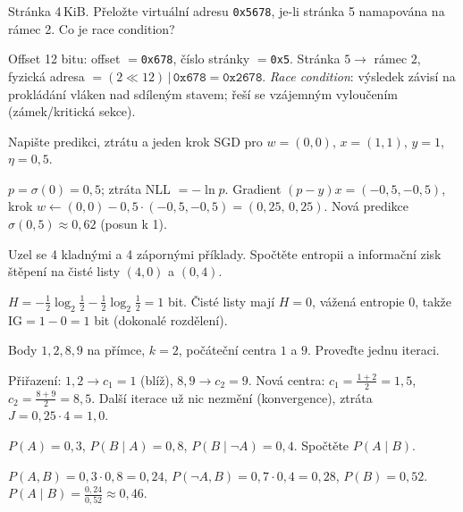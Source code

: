 \begin{zadani}Stránka 4\,KiB. Přeložte virtuální adresu \texttt{0x5678}, je-li stránka 5 namapována na rámec 2. Co je race condition?\end{zadani}
\begin{reseni}Offset 12 bitu: offset $=$\texttt{0x678}, číslo stránky $=$\texttt{0x5}. Stránka $5\to$ rámec $2$, fyzická adresa $=(2\ll12)\,|\,\texttt{0x678}=\texttt{0x2678}$. \emph{Race condition}: výsledek závisí na prokládání vláken nad sdíleným stavem; řeší se vzájemným vyloučením (zámek/kritická sekce).\end{reseni}

\begin{zadani}Napište predikci, ztrátu a jeden krok SGD pro $w=(0,0)$, $x=(1,1)$, $y=1$, $\eta=0{,}5$.\end{zadani}
\begin{reseni}$p=\sigma(0)=0{,}5$; ztráta NLL $=-\ln p$. Gradient $(p-y)x=(-0{,}5,-0{,}5)$, krok $w\leftarrow(0,0)-0{,}5\cdot(-0{,}5,-0{,}5)=(0{,}25,\,0{,}25)$. Nová predikce $\sigma(0{,}5)\approx0{,}62$ (posun k 1).\end{reseni}

\begin{zadani}Uzel se 4 kladnými a 4 zápornými příklady. Spočtěte entropii a informační zisk štěpení na čisté listy $(4,0)$ a $(0,4)$.\end{zadani}
\begin{reseni}$H=-\tfrac12\log_2\tfrac12-\tfrac12\log_2\tfrac12=1$ bit. Čisté listy mají $H=0$, vážená entropie $0$, takže $\mathrm{IG}=1-0=1$ bit (dokonalé rozdělení).\end{reseni}

\begin{zadani}Body $1,2,8,9$ na přímce, $k=2$, počáteční centra $1$ a $9$. Proveďte jednu iteraci.\end{zadani}
\begin{reseni}Přiřazení: $1,2\to c_1{=}1$ (blíž), $8,9\to c_2{=}9$. Nová centra: $c_1=\tfrac{1+2}{2}=1{,}5$, $c_2=\tfrac{8+9}{2}=8{,}5$. Další iterace už nic nezmění (konvergence), ztráta $J=0{,}25\cdot4=1{,}0$.\end{reseni}

\begin{zadani}$P(A)=0{,}3$, $P(B\mid A)=0{,}8$, $P(B\mid\neg A)=0{,}4$. Spočtěte $P(A\mid B)$.\end{zadani}
\begin{reseni}$P(A,B)=0{,}3\cdot0{,}8=0{,}24$, $P(\neg A,B)=0{,}7\cdot0{,}4=0{,}28$, $P(B)=0{,}52$. $P(A\mid B)=\tfrac{0{,}24}{0{,}52}\approx0{,}46$.\end{reseni}


